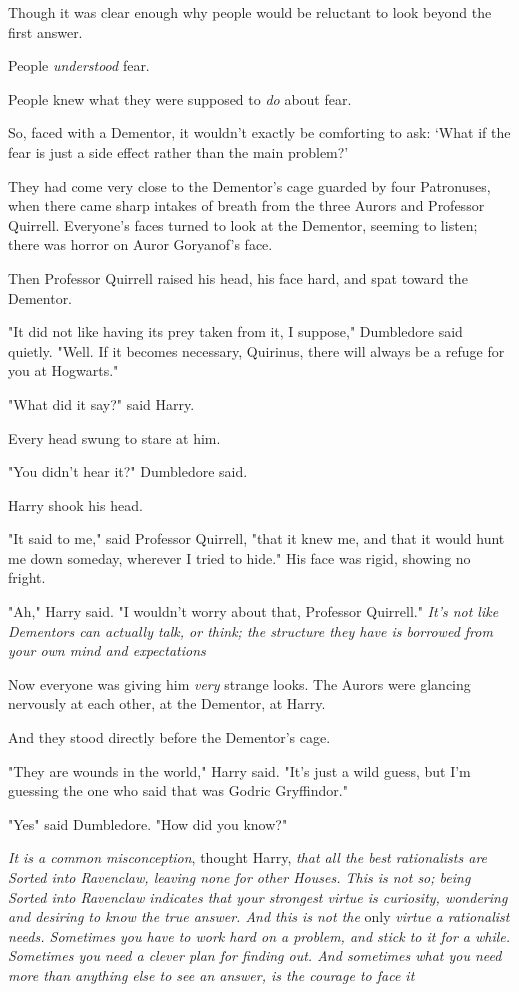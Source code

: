 Though it was clear enough why people would be reluctant to look beyond the
first answer.

People \emph{understood} fear.

People knew what they were supposed to \emph{do} about fear.

So, faced with a Dementor, it wouldn't exactly be comforting to ask: `What if
the fear is just a side effect rather than the main problem?'

They had come very close to the Dementor's cage guarded by four Patronuses,
when there came sharp intakes of breath from the three Aurors and Professor
Quirrell. Everyone's faces turned to look at the Dementor, seeming to listen;
there was horror on Auror Goryanof's face.

Then Professor Quirrell raised his head, his face hard, and spat toward the
Dementor.

"It did not like having its prey taken from it, I suppose," Dumbledore said
quietly. "Well. If it becomes necessary, Quirinus, there will always be a
refuge for you at Hogwarts."

"What did it say?" said Harry.

Every head swung to stare at him.

"You didn't hear it{\el}?" Dumbledore said.

Harry shook his head.

"It said to me," said Professor Quirrell, "that it knew me, and that it would
hunt me down someday, wherever I tried to hide." His face was rigid, showing no
fright.

"Ah," Harry said. "I wouldn't worry about that, Professor Quirrell." \emph{It's
not like Dementors can actually talk, or think; the structure they have is
borrowed from your own mind and expectations{\el}}

Now everyone was giving him \emph{very} strange looks. The Aurors were glancing
nervously at each other, at the Dementor, at Harry.

And they stood directly before the Dementor's cage.

"They are wounds in the world," Harry said. "It's just a wild guess, but I'm
guessing the one who said that was Godric Gryffindor."

"Yes{\el}" said Dumbledore. "How did you know?"

\emph{It is a common misconception}, thought Harry, \emph{that all the best
rationalists are Sorted into Ravenclaw, leaving none for other Houses. This is
not so; being Sorted into Ravenclaw indicates that your strongest virtue is
curiosity, wondering and desiring to know the true answer. And this is not the}
only \emph{virtue a rationalist needs. Sometimes you have to work hard on a
problem, and stick to it for a while. Sometimes you need a clever plan for
finding out. And sometimes what you need more than anything else to see an
answer, is the courage to face it{\el}}

